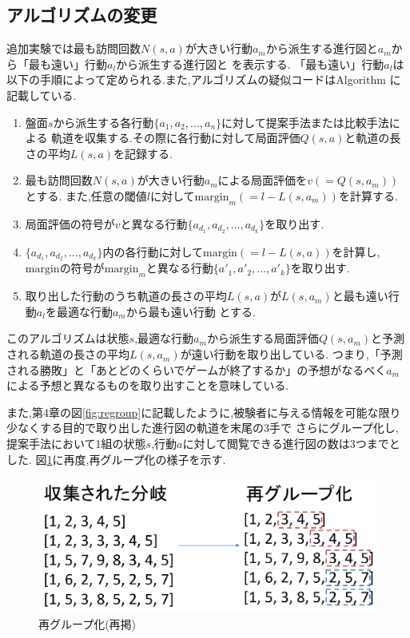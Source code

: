 \subsection{アルゴリズムの変更}
追加実験では最も訪問回数$N(s, a)$が大きい行動$a_m$から派生する進行図と$a_m$から「最も遠い」行動$a_l$から派生する進行図と
を表示する.
「最も遠い」行動$a_l$は以下の手順によって定められる.また,アルゴリズムの疑似コードはAlgorithm\label{alg:myalg-add} に記載している.
\begin{enumerate}
    \item 盤面$s$から派生する各行動$\{a_1, a_2, ..., a_n\}$に対して提案手法または比較手法による
    軌道を収集する.その際に各行動に対して局面評価$Q(s, a)$と軌道の長さの平均$L(s, a)$を記録する.
    \item 最も訪問回数$N(s, a)$が大きい行動$a_m$による局面評価を$v(=Q(s, a_m))$とする.
    また,任意の閾値$l$に対して$\textrm{margin}_m(=l-L(s, a_m))$を計算する.
    \item 局面評価の符号が$v$と異なる行動$\{a_{d_1}, a_{d_2}, ..., a_{d_k}\}$を取り出す.
    \item $\{a_{d_1}, a_{d_2}, ..., a_{d_k}\}$内の各行動に対して$\textrm{margin}(=l-L(s, a))$を計算し,
    $\textrm{margin}$の符号が$\textrm{margin}_m$と異なる行動$\{{a'}_{1}, {a'}_{2}, ..., {a'}_{k}\}$を取り出す.
    \item 取り出した行動のうち軌道の長さの平均$L(s, a)$が$L(s, a_m)$と最も遠い行動$a_l$を最適な行動$a_m$から最も遠い行動
    とする.
\end{enumerate}
このアルゴリズムは状態$s$,最適な行動$a_m$から派生する局面評価$Q(s, a_m)$と予測される軌道の長さの平均$L(s, a_m)$が遠い行動を取り出している.
つまり,「予測される勝敗」と「あとどのくらいでゲームが終了するか」の予想がなるべく$a_m$による予想と異なるものを取り出すことを意味している.

また,第4章の図\ref{fig:regroup}に記載したように,被験者に与える情報を可能な限り少なくする目的で取り出した進行図の軌道を末尾の3手で
さらにグループ化し,提案手法において1組の状態$s$,行動$a$に対して閲覧できる進行図の数は3つまでとした.
図\ref{fig:re-regroup}に再度,再グループ化の様子を示す.
\begin{figure}[t]
	\centering
	\includegraphics[width=\linewidth]{./figure/regroup.pdf}
	\caption{再グループ化(再掲)}
	\label{fig:re-regroup}
\end{figure}

